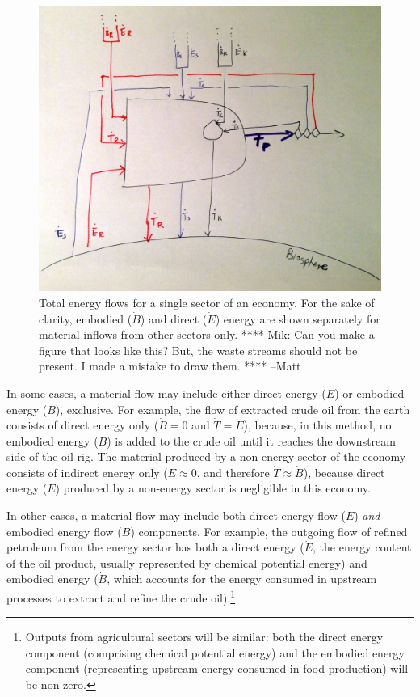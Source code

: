 \begin{figure}[h!]
	\centering
		\includegraphics[width=.9\textwidth]{Part_2/Chapter_Embodied/images/TotalEnergyOneProducer.pdf}
	\caption{Total energy flows for a single sector of an economy. 
	For the sake of clarity, 
	embodied ($\dot{B}$) and direct ($\dot{E}$) energy
	are shown separately for material inflows from other sectors only.
	**** Mik: Can you make a figure that looks like this? 
	But, the waste streams should not be present. 
	I made a mistake to draw them. **** --Matt}
	\label{fig:embodied_single_producer}
\end{figure}

In some cases, a material flow may include 
either direct energy ($\dot{E}$) 
or embodied energy ($\dot{B}$), exclusive. 
For example, the flow of extracted crude oil from the earth 
consists of direct energy only ($\dot{B} = 0$ and $\dot{T} = \dot{E}$), 
because, in this method, no embodied energy ($B$) is added 
to the crude oil until it reaches the downstream side of the oil rig.
The material produced by a non-energy sector of the economy 
consists of indirect energy only ($\dot{E} \approx 0$, 
and therefore $\dot{T} \approx \dot{B}$), 
because direct energy ($E$) produced by 
a non-energy sector is negligible in this economy. 

In other cases, a material flow may include both direct energy flow
($\dot{E}$) \emph{and} embodied energy flow ($\dot{B}$) components.
For example, the outgoing flow of refined petroleum from the energy sector 
has both a direct energy ($\dot{E}$, the energy content of the oil product, 
usually represented by chemical potential energy) 
and embodied energy ($\dot{B}$, which accounts for the energy 
consumed in upstream processes 
to extract and refine the crude oil).\footnote{Outputs from 
agricultural sectors will be similar: 
both the direct energy component (comprising chemical potential energy) 
and the embodied energy component (representing upstream
energy consumed in food production) will be non-zero.}

